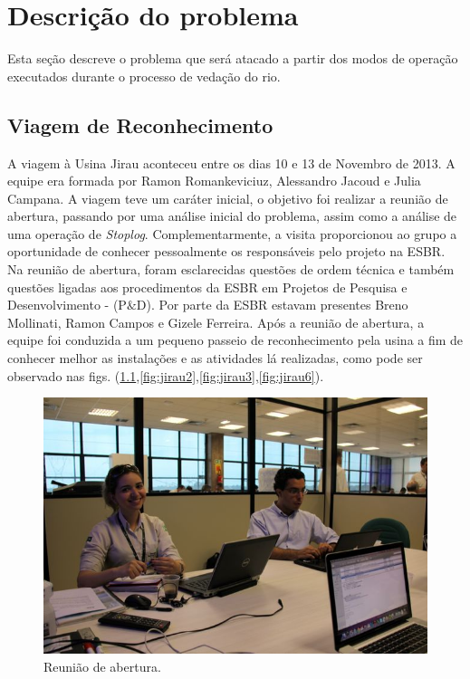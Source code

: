 

\chapter{Descrição do problema}
Esta seção descreve o problema que será atacado a partir dos modos de operação
executados durante o processo de vedação do rio.

\section{Viagem de Reconhecimento}
A viagem à Usina Jirau aconteceu entre os dias 10 e 13 de Novembro de 2013. A
equipe era formada por Ramon Romankeviciuz, Alessandro
Jacoud e Julia Campana. A viagem teve um caráter inicial, o objetivo foi realizar a
reunião de abertura, passando por  uma análise inicial do problema, assim como a
análise de uma operação de \emph{Stoplog}. Complementarmente, a visita proporcionou ao
grupo a oportunidade de conhecer pessoalmente os responsáveis pelo projeto na
ESBR.
Na reunião de abertura, foram esclarecidas questões de ordem técnica e também
questões ligadas aos procedimentos da ESBR em Projetos de Pesquisa e Desenvolvimento -
(P$\&$D).  Por parte da ESBR estavam presentes Breno Mollinati, Ramon Campos e
Gizele Ferreira. Após a reunião de abertura, a equipe foi conduzida a um
pequeno passeio de reconhecimento pela usina a fim de conhecer melhor as
instalações e as atividades lá realizadas, como pode ser observado nas
figs.
(\ref{fig:jirau1},\ref{fig:jirau2},\ref{fig:jirau3},\ref{fig:jirau6}).

 \begin{figure}[ht!]
    \centering \includegraphics[width=0.6\columnwidth]{figs/jirau/jirau_01}
    \caption{Reunião de abertura.}
    \label{fig:jirau1}
\end{figure}

